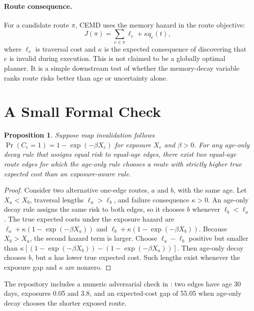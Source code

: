 \documentclass{article}
\newtheorem{proposition}{Proposition}
\begin{document}
\paragraph{Route consequence.}
For a candidate route $\pi$, CEMD uses the memory hazard in the route objective:
\begin{equation}
J(\pi)=\sum_{e \in \pi} \ell_e + \kappa q_e(t),
\end{equation}
where $\ell_e$ is traversal cost and $\kappa$ is the expected consequence of discovering that $e$ is invalid during execution. This is not claimed to be a globally optimal planner. It is a simple downstream test of whether the memory-decay variable ranks route risks better than age or uncertainty alone.

\section{A Small Formal Check}

\begin{proposition}
Suppose map invalidation follows $\Pr(C_e=1)=1-\exp(-\beta X_e)$ for exposure $X_e$ and $\beta>0$. For any age-only decay rule that assigns equal risk to equal-age edges, there exist two equal-age route edges for which the age-only rule chooses a route with strictly higher true expected cost than an exposure-aware rule.
\end{proposition}

\begin{proof}
Consider two alternative one-edge routes, $a$ and $b$, with the same age. Let $X_a<X_b$, traversal lengths $\ell_a>\ell_b$, and failure consequence $\kappa>0$. An age-only decay rule assigns the same risk to both edges, so it chooses $b$ whenever $\ell_b<\ell_a$. The true expected costs under the exposure hazard are
$\ell_a+\kappa(1-\exp(-\beta X_a))$ and
$\ell_b+\kappa(1-\exp(-\beta X_b))$.
Because $X_b>X_a$, the second hazard term is larger. Choose $\ell_a-\ell_b$ positive but smaller than
$\kappa[(1-\exp(-\beta X_b))-(1-\exp(-\beta X_a))]$.
Then age-only decay chooses $b$, but $a$ has lower true expected cost. Such lengths exist whenever the exposure gap and $\kappa$ are nonzero.
\end{proof}

The repository includes a numeric adversarial check in : two edges have age 30 days, exposures 0.05 and 3.8, and an expected-cost gap of 55.05 when age-only decay chooses the shorter exposed route.
\end{document}
